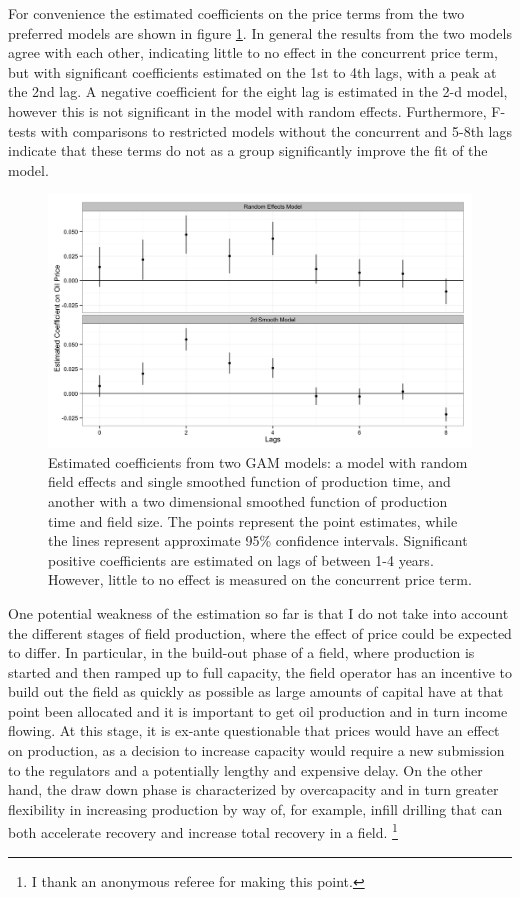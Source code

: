 \documentclass[12pt]{article}
\begin{document}
 
For convenience the estimated coefficients on the price terms from the two preferred models are shown in figure \ref{price_coefficients}. In general the results from the two models agree with each other, indicating little to no effect in the concurrent price term, but with significant coefficients estimated on the 1st to 4th lags, with a peak at the 2nd lag. A negative coefficient for the eight lag is estimated in the 2-d model, however this is not significant in the model with random effects. Furthermore, F-tests with comparisons to restricted models without the concurrent and 5-8th lags indicate that these terms do not as a group significantly improve the fit of the model.

\begin{figure}
	\includegraphics[width=1\textwidth]{figures/price_coefficents.png}
	\caption{Estimated coefficients from two GAM models: a model with random field effects and single smoothed function of production time, and another with a two dimensional smoothed function of production time and field size.  The points represent the point estimates, while the lines represent approximate 95\% confidence intervals. Significant positive coefficients are estimated on lags of between 1-4 years.  However, little to no effect is measured on the concurrent price term.}
	\label{price_coefficients}
\end{figure}

One potential weakness of the estimation so far is that I do not take into account the different stages of field production, where the effect of price could be expected to differ. 
In particular, in the build-out phase of a field, where production is started and then ramped up to full capacity, the field operator has an incentive to build out the field as quickly as possible as large amounts of capital have at that point been allocated and it is important to get oil production and in turn income flowing. At this stage, it is ex-ante questionable that prices would have an effect on production, as a decision to increase capacity would require a new submission to the regulators and a potentially lengthy and expensive delay. On the other hand, the draw down phase is characterized by overcapacity and in turn greater flexibility in increasing production by way of, for example, infill drilling that can both accelerate recovery and increase total recovery in a field. \footnote{I thank an anonymous referee for making this point.}
\end{document}
